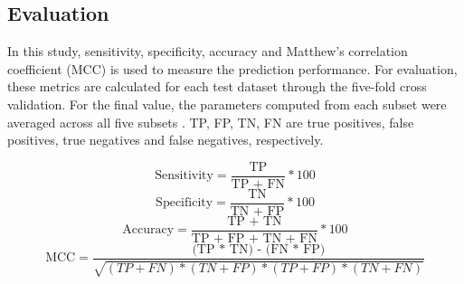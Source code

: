 
    \subsection{Evaluation}
        
        In this study, sensitivity, specificity, accuracy and Matthew's correlation coefficient (MCC) is used to measure the 
        prediction performance. For evaluation, these metrics are calculated for each test dataset through the five-fold cross validation.
        For the final value, the parameters computed from each subset were averaged across all five subsets . TP, FP, TN, FN are 
        true positives, false positives, true negatives and false negatives, respectively. 

        \begin{equation}
            \text{Sensitivity} = \frac {\text{TP}}{\text{TP + FN}} * 100
        \end{equation}
        \begin{equation}
            \text{Specificity} = \frac {\text{TN}}{\text{TN + FP}} * 100
        \end{equation}
        \begin{equation}
            \text{Accuracy} = \frac {\text{TP + TN}}{\text{TP + FP + TN + FN}} * 100
        \end{equation}
        \begin{equation}
            \text{MCC} = \frac {\text{(TP * TN) - (FN * FP)}}{\sqrt{(TP + FN) * (TN + FP) * (TP + FP) * (TN + FN)}}
        \end{equation}

